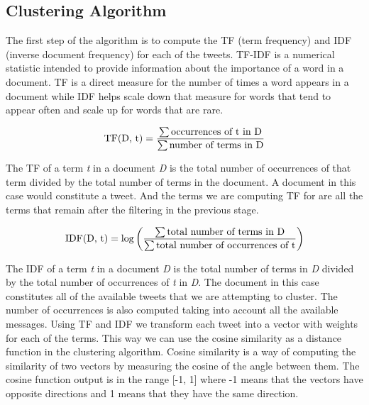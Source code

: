 \subsection{Clustering Algorithm}
\label{clusteringalgorithm}

The first step of the algorithm is to compute the TF  (term frequency) and IDF  (inverse document frequency) for each of the tweets. TF-IDF is a numerical statistic intended to provide information about the importance of a word in a document. TF is a direct measure for the number of times a word appears in a document while IDF helps scale down that measure for words that tend to appear often and scale up for words that are rare.

\begin{equation}
	\text{TF(D, t)} = {\sum \textrm{occurrences of t in D} \over
						\sum \textrm{number of terms in D}}
\end{equation}

The TF of a term \textit{t} in a document \textit{D} is the total number of occurrences of that term divided by the total number of terms in the document. A document in this case would constitute a tweet. And the terms we are computing TF for are all the terms that remain after the filtering in the previous stage.

\begin{equation}
	\text{IDF(D, t)} = { \log \bigg( {\sum \textrm{total number of terms in D} \over
						\sum \textrm{total number of occurrences of t}} \bigg) }	
\end{equation}

The IDF of a term \textit{t} in a document \textit{D} is the total number of terms in \textit{D} divided by the total number of occurrences of \textit{t} in \textit{D}. The document in this case constitutes all of the available tweets that we are attempting to cluster. The number of occurrences is also computed taking into account all the available messages.
\newline
Using TF and IDF we transform each tweet into a vector with weights for each of the terms. This way we can use the cosine similarity as a distance function in the clustering algorithm. Cosine similarity is a way of computing the similarity of two vectors by measuring the cosine of the angle between them. The cosine function output is in the range [-1, 1] where -1 means that the vectors have opposite directions and 1 means that they have the same direction. 

